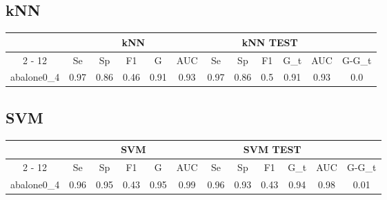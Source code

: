 \documentclass{article}%
\begin{document}
%
\subsection*{kNN}%
\begin{tabular}{|c|c|c|c|c|c|c|c|c|c|c|c|}%
\hline%
&\multicolumn{5}{|c|}{kNN}&\multicolumn{5}{|c|}{kNN TEST}&\\%
\cline{2%
-%
12}%
&Se&Sp&F1&G&AUC&Se&Sp&F1&G\_t&AUC&G{-}G\_t\\%
\hline%
abalone0\_4&0.97&0.86&0.46&0.91&0.93&0.97&0.86&0.5&0.91&0.93&0.0\\%
\hline%
\end{tabular}

%
\subsection*{SVM}%
\begin{tabular}{|c|c|c|c|c|c|c|c|c|c|c|c|}%
\hline%
&\multicolumn{5}{|c|}{SVM}&\multicolumn{5}{|c|}{SVM TEST}&\\%
\cline{2%
-%
12}%
&Se&Sp&F1&G&AUC&Se&Sp&F1&G\_t&AUC&G{-}G\_t\\%
\hline%
abalone0\_4&0.96&0.95&0.43&0.95&0.99&0.96&0.93&0.43&0.94&0.98&0.01\\%
\hline%
\end{tabular}

%
\end{document}
